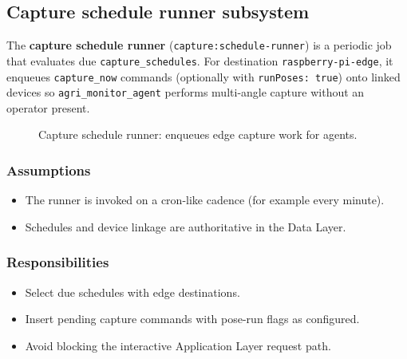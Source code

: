 \subsection{Capture schedule runner subsystem}

The \textbf{capture schedule runner} (\texttt{capture:schedule-runner}) is a periodic job that evaluates due \texttt{capture\_schedules}. For destination \texttt{raspberry-pi-edge}, it enqueues \texttt{capture\_now} commands (optionally with \texttt{runPoses: true}) onto linked devices so \texttt{agri\_monitor\_agent} performs multi-angle capture without an operator present.

\begin{figure}[H]
\centering
{}
\caption{Capture schedule runner: enqueues edge capture work for agents.}
\label{fig:proc-sched-runner}
\end{figure}

\subsubsection{Assumptions}
\begin{itemize}
  \item The runner is invoked on a cron-like cadence (for example every minute).
  \item Schedules and device linkage are authoritative in the Data Layer.
\end{itemize}

\subsubsection{Responsibilities}
\begin{itemize}
  \item Select due schedules with edge destinations.
  \item Insert pending capture commands with pose-run flags as configured.
  \item Avoid blocking the interactive Application Layer request path.
\end{itemize}

